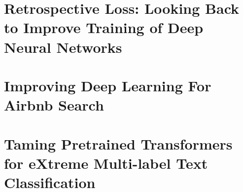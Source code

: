 \begin{bibunit}[plainnat]

\chapter{Retrospective Loss: Looking Back to Improve Training of Deep Neural Networks}
\cite{jandial2020retrospective}

\chapter{Improving Deep Learning For Airbnb Search}
\cite{haldar2020improving}

\chapter{Taming Pretrained Transformers for eXtreme Multi-label Text Classification}

\putbib[refs_dl]
\end{bibunit}
